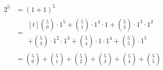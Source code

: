 \documentclass{article}
\begin{document}
    \begin{align*}
        2^5 &= (1+1)^5\\
        &= \begin{multlined}[t]
            \binom50\cdot 1^5 + \binom51\cdot 1^4 \cdot 1 + \binom53\cdot 1^3 \cdot 1^2 \\
            + \binom53\cdot 1^2 \cdot 1^3 + \binom54\cdot1 \cdot 1^4 + \binom55\cdot 1^5
        \end{multlined} \\
        &= \binom50 + \binom51 + \binom52 + \binom53 + \binom54 + \binom55
    \end{align*}
\end{document}
